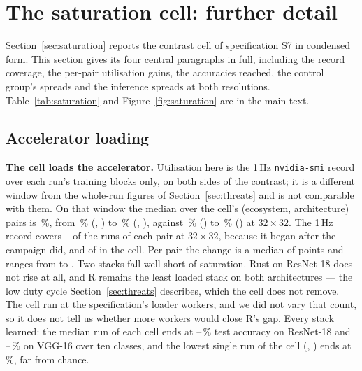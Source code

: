\begin{table}[t]
\centering
\caption{Tracked share of the interval from a run's first block to its last,
and how much of the remainder is the instrument's own window. Not wall time: the
denominator excludes start-up, dataset construction and teardown. Coverage
follows block length, not the ecosystem --- with \vWindowUnpaddedEco{} the
exception, whose untracked time is almost none of it.}
\label{tab:coverage}
{\footnotesize\setlength{\tabcolsep}{3pt}}
\end{table}

\section{The saturation cell: further detail}
\label{app:saturation}

Section~\ref{sec:saturation} reports the contrast cell of specification S7 in
condensed form. This section gives its four central paragraphs in full,
including the record coverage, the per-pair utilisation gains, the accuracies
reached, the control group's spreads and the inference spreads at both
resolutions. Table~\ref{tab:saturation} and Figure~\ref{fig:saturation} are in
the main text.

\subsection{Accelerator loading}
\label{app:sat-util}

\textbf{The cell loads the accelerator.} Utilisation here is the 1\,Hz
\texttt{nvidia-smi} record over each run's training blocks only, on both sides
of the contrast; it is a different window from the whole-run figures of
Section~\ref{sec:threats} and is not comparable with them. On that window the
median over the cell's \vSatUtilCells{} (ecosystem, architecture) pairs is
\vSatUtilMedian\,\%, from \vSatUtilMin\,\% (\vSatUtilMinEco, \vSatUtilMinModel)
to \vSatUtilMax\,\% (\vSatUtilMaxEco, \vSatUtilMaxModel), against
\vSatRefUtilMin\,\% (\vSatRefUtilMinEco) to \vSatRefUtilMax\,\%
(\vSatRefUtilMaxEco) at $32\times32$. The 1\,Hz record covers
\vSatRefUtilRunsMin--\vSatRefUtilRunsMax{} of the \vSatRefUtilRunsPerPair{} runs
of each pair at $32\times32$, because it began after the campaign did, and
\vSatUtilRuns{} of \vSatUtilRunsOf{} in the cell. Per pair the change is a median of
\vSatUtilGainMedian{} points and ranges from \vSatUtilGainMin{} to
\vSatUtilGainMax. Two stacks fall well short of saturation. Rust on ResNet-18
does not rise at all, and R remains the least loaded stack on both
architectures --- the low duty cycle Section~\ref{sec:threats} describes, which
the cell does not remove. The cell ran at the specification's
\vSatLoaderThreads{} loader workers, and we did not vary that count, so it does
not tell us whether more workers would close R's gap. Every stack learned: the median run of each
cell ends at \vSatAccResnetMin--\vSatAccResnetMax\,\% test accuracy on
ResNet-18 and \vSatAccVggMin--\vSatAccVggMax\,\% on VGG-16 over ten classes,
and the lowest single run of the cell (\vSatAccRunMinEco, \vSatAccRunMinModel)
ends at \vSatAccRunMin\,\%, far from chance.

